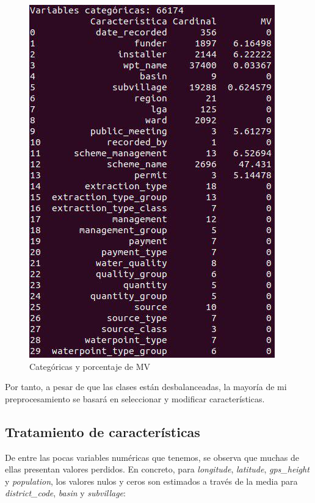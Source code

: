 \begin{figure}[H] %
	\centering
	\includegraphics[scale=0.5]{categoricas.jpg}  %
	\caption{Categóricas y porcentaje de MV} 
	\label{fig:cat}
\end{figure}

Por tanto, a pesar de que las clases están desbalanceadas, la mayoría de mi preprocesamiento se basará en seleccionar y modificar características.

\subsection{Tratamiento de características}

De entre las pocas variables numéricas que tenemos, se observa que muchas de ellas presentan valores perdidos. En concreto, para \textit{longitude}, \textit{latitude}, \textit{gps\_height} y \textit{population}, los valores nulos y ceros son estimados a través de la media para \textit{district\_code}, \textit{basin} y \textit{subvillage}:

